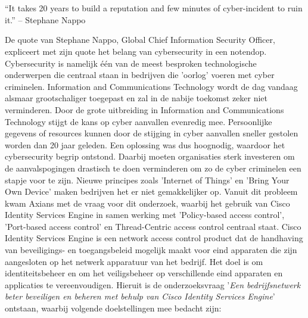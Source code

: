 
\chapter{}
\label{ch:inleiding}

\begin{displayquote}
	“It takes 20 years to build a reputation and few minutes of cyber-incident to ruin it.” – Stephane Nappo
\end{displayquote}

De quote van Stephane Nappo, Global Chief Information Security Officer, expliceert met zijn quote het belang van cybersecurity in een notendop. Cybersecurity is namelijk één van de meest besproken technologische onderwerpen die centraal staan in bedrijven die 'oorlog' voeren met cyber criminelen. Information and Communications Technology wordt de dag vandaag alsmaar grootschaliger toegepast en zal in de nabije toekomst zeker niet verminderen. Door de grote uitbreiding in Information and Communications Technology stijgt de kans op cyber aanvallen evenredig mee. Persoonlijke gegevens of resources kunnen door de stijging in cyber aanvallen sneller gestolen worden dan 20 jaar geleden. Een oplossing was dus hoognodig, waardoor het cybersecurity begrip ontstond. 
\newline
\newline
Daarbij moeten organisaties sterk investeren om de aanvalspogingen drastisch te doen verminderen om zo de cyber criminelen een stapje voor te zijn. Nieuwe principes zoals 'Internet of Things' en 'Bring Your Own Device' maken bedrijven het er niet gemakkelijker op. Vanuit dit probleem kwam Axians met de vraag voor dit onderzoek, waarbij het gebruik van Cisco Identity Services Engine in samen werking met 'Policy-based access control', 'Port-based access control' en Thread-Centric access control centraal staat. Cisco Identity Services Engine is een network access control product dat de handhaving van beveiligings- en toegangsbeleid mogelijk maakt voor eind apparaten die zijn aangesloten op het netwerk apparatuur van het bedrijf. Het doel is om identiteitsbeheer en om het veiligsbeheer op verschillende eind apparaten en applicaties te vereenvoudigen.
\newline
\newline
Hieruit is de onderzoeksvraag '\textit{Een bedrijfsnetwerk beter beveiligen en beheren met behulp van Cisco Identity Services Engine}' ontstaan, waarbij volgende doelstellingen mee bedacht zijn: 

